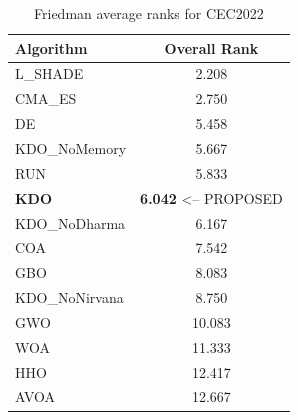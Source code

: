 \begin{table}[H]
\centering\small
\caption{Friedman average ranks for CEC2022}
\label{tab:cec2022_friedman}
\begin{tabular}{lc}
\toprule
\textbf{Algorithm} & \textbf{Overall Rank} \\
\midrule
L_SHADE & 2.208 \\
CMA_ES & 2.750 \\
DE & 5.458 \\
KDO_NoMemory & 5.667 \\
RUN & 5.833 \\
\textbf{KDO} & \textbf{6.042}  <-- PROPOSED \\
KDO_NoDharma & 6.167 \\
COA & 7.542 \\
GBO & 8.083 \\
KDO_NoNirvana & 8.750 \\
GWO & 10.083 \\
WOA & 11.333 \\
HHO & 12.417 \\
AVOA & 12.667 \\
\bottomrule
\end{tabular}
\end{table}
